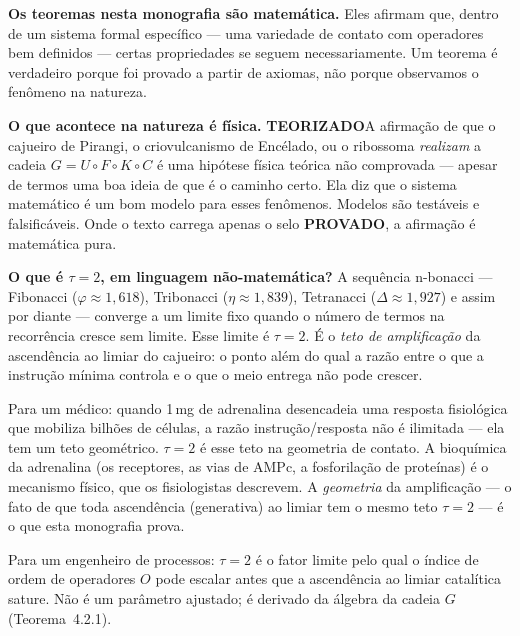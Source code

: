 \documentclass[12pt,a4paper,twoside]{book}
\theoremstyle{plain}
\theoremstyle{definition}
\newcommand{\provadostamp}{\noindent\colorbox{cajunavy!10}{\color{cajunavy}\bfseries\small PROVADO}\quad}
\newcommand{\teorizadostamp}{\noindent\colorbox{cajugold!20}{\color{cajugold!60!black}\bfseries\small TEORIZADO}\quad}
\theoremstyle{definition}
\begin{document}
\begin{tcolorbox}[
  colback=cajunavy!5,
  colframe=cajunavy!40,
  title={Para o leitor biólogo, médico ou engenheiro químico},
  breakable
]

\textbf{Os teoremas nesta monografia são matemática.}
Eles afirmam que, dentro de um sistema formal específico --- uma variedade de
contato com operadores bem definidos --- certas propriedades se seguem
necessariamente. Um teorema é verdadeiro porque foi provado a partir de
axiomas, não porque observamos o fenômeno na natureza.

\medskip
\textbf{O que acontece na natureza é física.}
\teorizadostamp A afirmação de que o cajueiro de Pirangi, o criovulcanismo de
Encélado, ou o ribossoma \emph{realizam} a cadeia $G = U \circ F \circ K \circ C$
é uma hipótese física teórica não comprovada --- apesar de termos uma boa ideia
de que é o caminho certo. Ela diz que o sistema matemático é um bom modelo para
esses fenômenos. Modelos são testáveis e falsificáveis.
Onde o texto carrega apenas o selo \provadostamp, a afirmação é matemática pura.

\medskip
\textbf{O que é $\tau = 2$, em linguagem não-matemática?}
A sequência n-bonacci --- Fibonacci ($\varphi \approx 1{,}618$),
Tribonacci ($\eta \approx 1{,}839$), Tetranacci ($\Delta \approx 1{,}927$)
e assim por diante --- converge a um limite fixo quando o número de
termos na recorrência cresce sem limite. Esse limite é $\tau = 2$.
É o \emph{teto de amplificação} da ascendência ao limiar do cajueiro:
o ponto além do qual a razão entre o que a instrução mínima controla
e o que o meio entrega não pode crescer.

Para um médico: quando 1\,mg de adrenalina desencadeia uma resposta
fisiológica que mobiliza bilhões de células, a razão
instrução/resposta não é ilimitada --- ela tem um teto geométrico.
$\tau = 2$ é esse teto na geometria de contato. A bioquímica da
adrenalina (os receptores, as vias de AMPc, a fosforilação de
proteínas) é o mecanismo físico, que os fisiologistas descrevem.
A \emph{geometria} da amplificação --- o fato de que toda ascendência
(generativa) ao limiar tem o mesmo teto $\tau = 2$ --- é o que esta monografia prova.

Para um engenheiro de processos: $\tau = 2$ é o fator limite pelo qual
o índice de ordem de operadores $O$ pode escalar antes que a ascendência ao limiar
catalítica sature. Não é um parâmetro ajustado; é derivado da álgebra
da cadeia $G$ (Teorema~4.2.1).


\end{tcolorbox}
\end{document}

